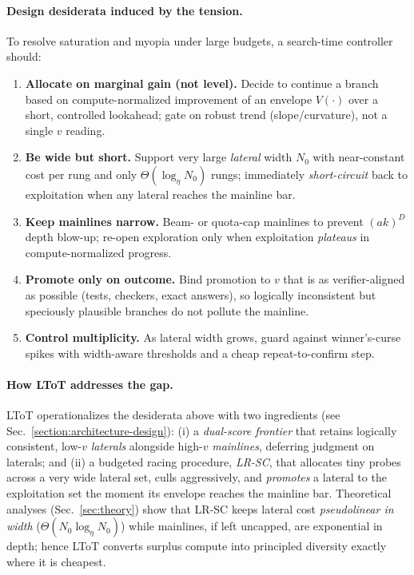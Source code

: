 \documentclass{article}
\begin{document}
\paragraph{Design desiderata induced by the tension.}
To resolve saturation and myopia under large budgets, a search-time controller should:
\begin{enumerate}[leftmargin=*, itemsep=2pt, topsep=2pt]
    \item \textbf{Allocate on marginal gain (not level).} Decide to continue a branch based on compute-normalized improvement of an envelope $V(\cdot)$ over a short, controlled lookahead; gate on robust trend (slope/curvature), not a single $v$ reading.
    \item \textbf{Be wide but short.} Support very large \emph{lateral} width $N_0$ with near-constant cost per rung and only $\Theta(\log_{\eta} N_0)$ rungs; immediately \emph{short-circuit} back to exploitation when any lateral reaches the mainline bar.
    \item \textbf{Keep mainlines narrow.} Beam- or quota-cap mainlines to prevent $(ak)^D$ depth blow-up; re-open exploration only when exploitation \emph{plateaus} in compute-normalized progress.
    \item \textbf{Promote only on outcome.} Bind promotion to $v$ that is as verifier-aligned as possible (tests, checkers, exact answers), so logically inconsistent but speciously plausible branches do not pollute the mainline.
    \item \textbf{Control multiplicity.} As lateral width grows, guard against winner's-curse spikes with width-aware thresholds and a cheap repeat-to-confirm step.
\end{enumerate}

\paragraph{How LToT addresses the gap.}
LToT operationalizes the desiderata above with two ingredients (see Sec.~\ref{section:architecture-design}):
(i) a \emph{dual-score frontier} that retains logically consistent, low-$v$ \emph{laterals} alongside high-$v$ \emph{mainlines}, deferring judgment on laterals; and
(ii) a budgeted racing procedure, \emph{LR-SC}, that allocates tiny probes across a very wide lateral set, culls aggressively, and \emph{promotes} a lateral to the exploitation set the moment its envelope reaches the mainline bar.
Theoretical analyses (Sec.~\ref{sec:theory}) show that LR-SC keeps lateral cost \emph{pseudolinear in width} ($\Theta(N_0\log_{\eta} N_0)$) while mainlines, if left uncapped, are exponential in depth; hence LToT converts surplus compute into principled diversity exactly where it is cheapest.
\end{document}
